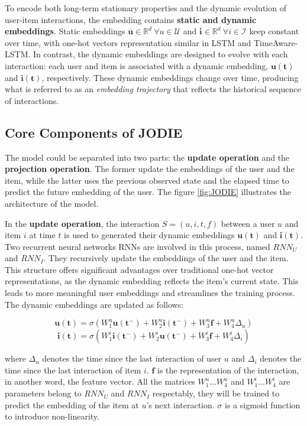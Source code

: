 To encode both long-term stationary properties and the dynamic evolution of user-item interactions, the embedding contains \textbf{static and dynamic embeddings}. Static embeddings $\mathbf{\overline{u} } \in \mathbb{R} ^d \ \forall u \in \mathcal{U}$ and $\mathbf{\overline{i} } \in \mathbb{R} ^d \ \forall i \in \mathcal{I}$ keep constant over time, with one-hot vectors representation similar in LSTM\cite{zhu2017next} and TimeAware-LSTM\cite{baytas2017patient}. In contrast, the dynamic embeddings are designed to evolve with each interaction: each user and item is associated with a dynamic embedding, $\mathbf{u(t)}$ and $\mathbf{i(t)}$, respectively. These dynamic embeddings change over time, producing what is referred to as an \textit{embedding trajectory} that reflects the historical sequence of interactions.


\subsection{Core Components of JODIE}

The model could be separated into two parts: the \textbf{update operation} and the \textbf{projection operation}. The former update the embeddings of the user and the item, while the latter uses the previous observed state and the elapsed time to predict the future embedding of the user. The figure \ref{fig:JODIE} illustrates the architecture of the model.

In the \textbf{update operation}, the interaction $S=(u,i,t,f)$ between a user $u$ and item $i$ at time $t$ is used to generated their dynamic embeddings $\mathbf{u(t)}$ and $\mathbf{i(t)}$. Two recurrent neural networks RNNs are involved in this process, named $RNN_U$ and  $RNN_I$. They recursively update the embeddings of the user and the item. This structure offers significant advantages over traditional one-hot vector representations, as the dynamic embedding reflects the item’s current state. This leads to more meaningful user embeddings and streamlines the training process. The dynamic embeddings are updated as follows:

\[ \mathbf{u(t)}=\sigma(W_1^u\mathbf{u(t^-)}+W_2^u\mathbf{i(t^-)}+W_3^u \mathbf{f}  + W^u_4 \Delta _u)\]
\[
\mathbf{i(t)} = \sigma (W_1^i \mathbf{i(t^-)} + W_2^i \mathbf{u(t^-)} + W_3^i \mathbf{f} + W_4^i \Delta_i)
\]



where $\Delta _u$ denotes the time since the last interaction of user $u$ and $\Delta _i$ denotes the time since the last interaction of item $i$. $\mathbf{f}$ is the representation of the interaction, in another word, the feature vector. All the matrices $W_1^u \dots W_4^u$ and $W_1^i \dots W_4^i$ are parameters belong to $RNN_U$ and $RNN_I$ respectably, they will be trained to predict the embedding of the item at $u$'s next interaction. $\sigma$ is a sigmoid function to introduce non-linearity.

